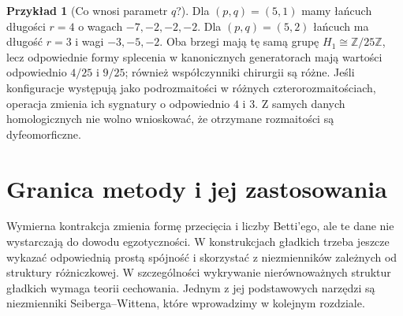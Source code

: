 \documentclass[11pt,a4paper]{report}
\numberwithin{equation}{section}
\theoremstyle{plain}
\theoremstyle{definition}
\newtheorem{przyklad}[twierdzenie]{Przykład}
\theoremstyle{remark}
\begin{document}
\begin{przyklad}[Co wnosi parametr $q$?]
Dla $(p,q)=(5,1)$ mamy łańcuch długości $r=4$ o wagach
$-7,-2,-2,-2$. Dla $(p,q)=(5,2)$ łańcuch ma długość
$r=3$ i wagi $-3,-5,-2$. Oba brzegi mają tę samą grupę
$H_1\cong\mathbb Z/25\mathbb Z$, lecz odpowiednie formy
splecenia w kanonicznych generatorach mają wartości
odpowiednio $4/25$ i $9/25$; również współczynniki chirurgii
są różne. Jeśli konfiguracje występują jako podrozmaitości
w różnych czterorozmaitościach, operacja zmienia ich sygnatury
o odpowiednio $4$ i $3$. Z samych danych homologicznych
nie wolno wnioskować, że otrzymane rozmaitości są dyfeomorficzne.
\end{przyklad}

\begin{center}
\end{center}

\section{Granica metody i jej zastosowania}
\label{sec:tg-general-limit}

Wymierna kontrakcja zmienia formę przecięcia i liczby Betti'ego,
ale te dane nie wystarczają do dowodu egzotyczności.
W konstrukcjach gładkich trzeba jeszcze wykazać odpowiednią
prostą spójność i skorzystać z niezmienników zależnych od
struktury różniczkowej. W szczególności wykrywanie
nierównoważnych struktur gładkich wymaga teorii cechowania.
Jednym z jej podstawowych narzędzi są niezmienniki
Seiberga--Wittena, które wprowadzimy w kolejnym rozdziale.
\end{document}
